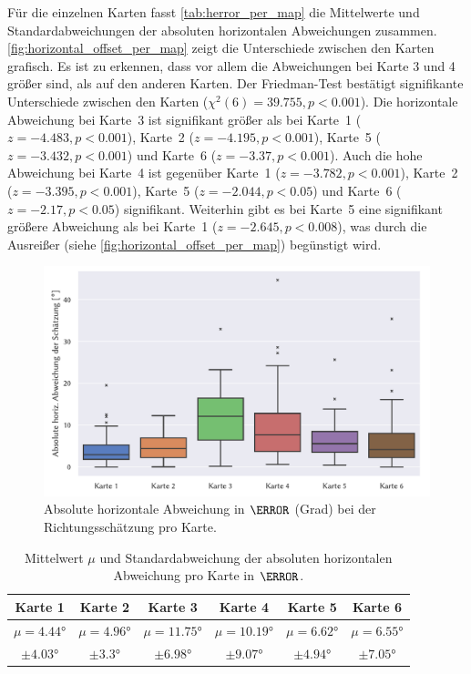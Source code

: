 Für die einzelnen Karten fasst \autoref{tab:herror_per_map} die Mittelwerte und Standardabweichungen der absoluten horizontalen Abweichungen zusammen.
\autoref{fig:horizontal_offset_per_map} zeigt die Unterschiede zwischen den Karten grafisch.
Es ist zu erkennen, dass vor allem die Abweichungen bei Karte 3 und 4 größer sind, als auf den anderen Karten.
Der Friedman-Test bestätigt signifikante Unterschiede zwischen den Karten ($\chi^2(6) = \num{39.755}, p < \num{0.001}$).
Die horizontale Abweichung bei Karte~3 ist signifikant größer als bei Karte~1 ($z = \num{-4,483}, p < \num{0,001}$), Karte~2 ($z = \num{-4,195}, p < \num{0,001}$), Karte~5 ($z = \num{-3,432}, p < \num{0,001}$) und Karte~6 ($z = \num{-3,37}, p < \num{0,001}$).
Auch die hohe Abweichung bei Karte~4 ist gegenüber Karte~1 ($z = \num{-3,782}, p < \num{0,001}$), Karte~2 ($z = \num{-3,395}, p < \num{0,001}$), Karte~5 ($z = \num{-2,044}, p < \num{0,05}$) und Karte~6 ($z = \num{-2,17}, p < \num{0,05}$) signifikant.
Weiterhin gibt es bei Karte~5 eine signifikant größere Abweichung als bei Karte~1 ($z = \num{-2,645}, p < \num{0,008}$), was durch die Ausreißer (siehe \autoref{fig:horizontal_offset_per_map}) begünstigt wird.
\begin{figure}[h!]
    \centering
    \includegraphics[width=0.75\linewidth]{figures/analysis/horizontal_offset_per_map}
    \caption{Absolute horizontale Abweichung in $\degree$ (Grad) bei der Richtungsschätzung pro Karte.}
    \label{fig:horizontal_offset_per_map}
\end{figure}%

\begin{table}[h!]
    \centering
    \caption{Mittelwert $\mu$ und Standardabweichung der absoluten horizontalen Abweichung pro Karte in $\degree$.}
    \label{tab:herror_per_map}
    \begin{tabular}{cccccc}\toprule
        Karte 1 & Karte 2 & Karte 3 & Karte 4 & Karte 5 & Karte 6 \\\midrule
        $\mu = \ang{4,44}$ & $\mu = \ang{4,96}$ & $\mu = \ang{11,75}$ & $\mu = \ang{10,19}$ & $\mu = \ang{6,62}$ & $\mu = \ang{6,55}$ \\
        $\pm \ang{4,03}$ & $\pm \ang{3,3}$ & $\pm \ang{6,98}$ & $\pm \ang{9,07}$ & $\pm \ang{4,94}$ & $\pm \ang{7,05}$ \\\bottomrule
    \end{tabular}
\end{table}

